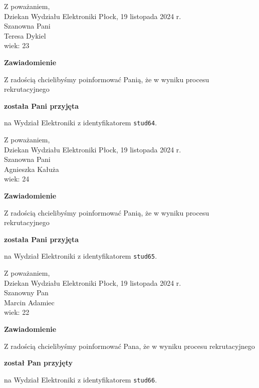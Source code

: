 \documentclass[12pt,a4paper]{article}
\begin{document}
\noindent
Z poważaniem,\\
Dziekan
Wydziału Elektroniki
\newpage
\hfill Płock, 19 listopada 2024 r.\\ 
\noindent 
Szanowna Pani \\
Teresa Dykiel \\
wiek: 23

\bigskip

\begin{center}
{\Large\textbf{Zawiadomienie}}
\end{center}
\bigskip
Z radością chcielibyśmy poinformować Panią, że w wyniku procesu rekrutacyjnego
\begin{center}
\textsf{\textbf{została Pani przyjęta}} 
\end{center}
na Wydział Elektroniki z identyfikatorem \verb|stud64|.
\vspace{2cm}

\noindent
Z poważaniem,\\
Dziekan
Wydziału Elektroniki
\newpage
\hfill Płock, 19 listopada 2024 r.\\ 
\noindent 
Szanowna Pani \\
Agnieszka Kałuża \\
wiek: 24

\bigskip

\begin{center}
{\Large\textbf{Zawiadomienie}}
\end{center}
\bigskip
Z radością chcielibyśmy poinformować Panią, że w wyniku procesu rekrutacyjnego
\begin{center}
\textsf{\textbf{została Pani przyjęta}} 
\end{center}
na Wydział Elektroniki z identyfikatorem \verb|stud65|.
\vspace{2cm}

\noindent
Z poważaniem,\\
Dziekan
Wydziału Elektroniki
\newpage
\hfill Płock, 19 listopada 2024 r.\\ 
\noindent 
Szanowny Pan \\
Marcin Adamiec \\
wiek: 22

\bigskip

\begin{center}
{\Large\textbf{Zawiadomienie}}
\end{center}
\bigskip
Z radością chcielibyśmy poinformować Pana, że w wyniku procesu rekrutacyjnego
\begin{center}
\textsf{\textbf{został Pan przyjęty}} 
\end{center}
na Wydział Elektroniki z identyfikatorem \verb|stud66|.
\vspace{2cm}
\end{document}
